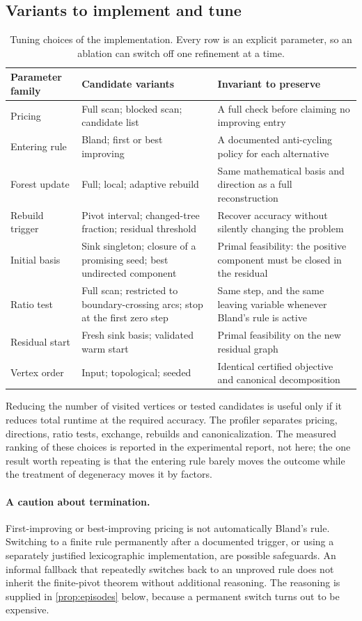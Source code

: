 \subsection{Variants to implement and tune}
\begin{table}[htbp]
\centering\small
\begin{tabular}{p{.22\linewidth}p{.32\linewidth}p{.35\linewidth}}
\toprule
Parameter family & Candidate variants & Invariant to preserve\\
\midrule
Pricing & Full scan; blocked scan; candidate list & A full check before claiming no improving entry\\
Entering rule & Bland; first or best improving & A documented anti-cycling policy for each alternative\\
Forest update & Full; local; adaptive rebuild & Same mathematical basis and direction as a full reconstruction\\
Rebuild trigger & Pivot interval; changed-tree fraction; residual threshold & Recover accuracy without silently changing the problem\\
Initial basis & Sink singleton; closure of a promising seed; best undirected component & Primal feasibility: the positive component must be closed in the residual\\
Ratio test & Full scan; restricted to boundary-crossing arcs; stop at the first zero step & Same step, and the same leaving variable whenever Bland's rule is active\\
Residual start & Fresh sink basis; validated warm start & Primal feasibility on the new residual graph\\
Vertex order & Input; topological; seeded & Identical certified objective and canonical decomposition\\
\bottomrule
\end{tabular}
\caption{Tuning choices of the implementation. Every row is an explicit
parameter, so an ablation can switch off one refinement at a time.}
\end{table}
Reducing the number of visited vertices or tested candidates is useful only if
it reduces total runtime at the required accuracy. The profiler separates
pricing, directions, ratio tests, exchange, rebuilds and canonicalization. The
measured ranking of these choices is reported in the experimental report, not
here; the one result worth repeating is that the entering rule barely moves the
outcome while the treatment of degeneracy moves it by factors.

\paragraph{A caution about termination.}
First-improving or best-improving pricing is not automatically Bland's rule.
Switching to a finite rule permanently after a documented trigger, or using
a separately justified lexicographic implementation, are possible safeguards.
An informal fallback that repeatedly switches back to an unproved rule does
not inherit the finite-pivot theorem without additional reasoning. The
reasoning is supplied in \cref{prop:episodes} below, because a permanent switch
turns out to be expensive.

